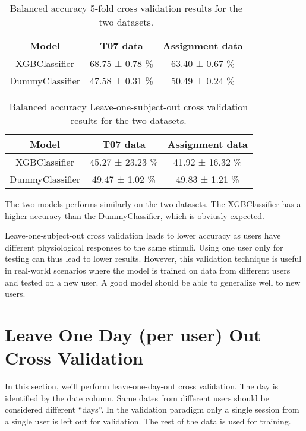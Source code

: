 \documentclass{usireport}
\begin{document}
\begin{table}[H]
    \centering
    \begin{tabular}{|c|c|c|}
        \hline
        \textbf{Model} & \textbf{T07 data} & \textbf{Assignment data} \\
        \hline
        XGBClassifier & 68.75 ± 0.78 \% & 63.40 ± 0.67 \% \\
        DummyClassifier & 47.58 ± 0.31 \% & 50.49 ± 0.24 \% \\
        \hline
    \end{tabular}
    \caption{Balanced accuracy 5-fold cross validation results for the two datasets.}
    \label{tab:5-fold-cross-validation}
\end{table}

\begin{table}[H]
    \centering
    \begin{tabular}{|c|c|c|}
        \hline
        \textbf{Model} & \textbf{T07 data} & \textbf{Assignment data} \\
        \hline
        XGBClassifier & 45.27 ± 23.23 \% & 41.92 ± 16.32 \% \\
        DummyClassifier & 49.47 ± 1.02 \% & 49.83 ± 1.21 \% \\
        \hline
    \end{tabular}
    \caption{Balanced accuracy Leave-one-subject-out cross validation results for the two datasets.}
    \label{tab:LOSO-cross-validation}
\end{table}


The two models performs similarly on the two datasets. The XGBClassifier has a higher accuracy than the DummyClassifier, which is obviusly expected.

Leave-one-subject-out cross validation leads to lower accuracy as users have different physiological responses to the same stimuli. Using one user only for testing can thus lead to lower results. However, this validation technique is useful in real-world scenarios where the model is trained on data from different users and tested on a new user. A good model should be able to generalize well to new users.


\section{Leave One Day (per user) Out Cross Validation}
In this section, we'll perform leave-one-day-out cross validation. The day is
identified by the date column. Same dates from different users should be
considered different “days”. In the validation paradigm only a single session from a single user is left out for validation. The rest of the data is used for training. 
\end{document}
